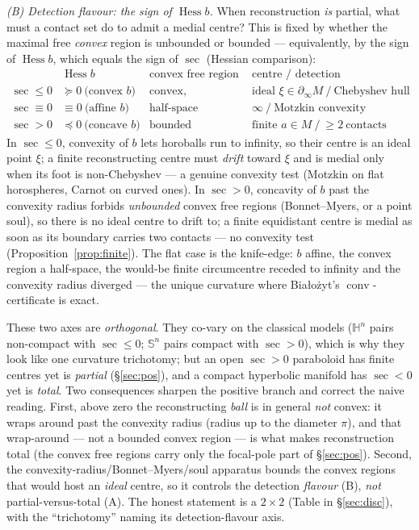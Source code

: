 \documentclass[11pt]{article}
\theoremstyle{remark}
\newcommand{\conv}{\operatorname{conv}}
\newcommand{\sect}{\operatorname{sec}}
\newcommand{\Hess}{\operatorname{Hess}}
\newcommand{\bdry}{\partial_{\infty}}
\newcommand{\HH}{\mathbb{H}}
\newcommand{\Sn}{\mathbb{S}^{n}}
\begin{document}
\smallskip\noindent\emph{(B) Detection flavour: the sign of $\Hess b$.}
When reconstruction \emph{is} partial, what must a contact set do to admit
a medial centre? This is fixed by whether the maximal free \emph{convex}
region is unbounded or bounded --- equivalently, by the sign of $\Hess b$,
which equals the sign of $\sect$ (Hessian comparison):
\[
\begin{array}{c|c|c|c}
 & \Hess b & \text{convex free region} & \text{centre / detection}\\\hline
\sect\le0 & \succeq0\ \text{(convex } b) & \text{convex, unbounded} &
  \text{ideal }\xi\in\bdry M\ /\ \text{Chebyshev hull}\\
\sect\equiv0 & \equiv0\ \text{(affine } b) & \text{half-space} &
  \infty\ /\ \text{Motzkin convexity}\\
\sect>0 & \preceq0\ \text{(concave } b) & \text{bounded} &
  \text{finite }a\in M\ /\ \ge2\ \text{contacts}
\end{array}
\]
In $\sect\le0$, convexity of $b$ lets horoballs run to infinity, so their
centre is an ideal point $\xi$; a finite reconstructing centre must
\emph{drift} toward $\xi$ and is medial only when its foot is non-Chebyshev
--- a genuine convexity test (Motzkin on flat horospheres, Carnot on curved
ones). In $\sect>0$, concavity of $b$ past the convexity radius forbids
\emph{unbounded} convex free regions (Bonnet--Myers, or a point soul), so
there is no ideal centre to drift to; a finite equidistant centre is medial
as soon as its boundary carries two contacts --- no convexity test
(Proposition~\ref{prop:finite}). The flat case is the knife-edge: $b$
affine, the convex region a half-space, the would-be finite circumcentre
receded to infinity and the convexity radius diverged --- the unique
curvature where Bia\l{}o\.zyt's $\conv$-certificate is exact.

\smallskip
These two axes are \emph{orthogonal}. They co-vary on the classical models
($\HH^{n}$ pairs non-compact with $\sect\le0$; $\Sn$ pairs compact with
$\sect>0$), which is why they look like one curvature trichotomy; but an
open $\sect>0$ paraboloid has finite centres yet is \emph{partial}
(\S\ref{sec:pos}), and a compact hyperbolic manifold has $\sect<0$ yet is
\emph{total}. Two consequences sharpen the positive branch and correct the
naive reading. First, above zero the reconstructing \emph{ball} is in
general \emph{not} convex: it wraps around past the convexity radius
(radius up to the diameter $\pi$), and that wrap-around --- not a bounded
convex region --- is what makes reconstruction total (the convex free
regions carry only the focal-pole part of \S\ref{sec:pos}). Second, the
convexity-radius/Bonnet--Myers/soul apparatus bounds the convex regions
that would host an \emph{ideal} centre, so it controls the detection
\emph{flavour} (B), \emph{not} partial-versus-total (A). The honest
statement is a $2\times2$ (Table in \S\ref{sec:disc}), with the
``trichotomy'' naming its detection-flavour axis.
\end{document}
